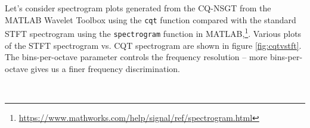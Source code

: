 \documentclass[report.tex]{subfiles}
\begin{document}
Let's consider spectrogram plots generated from the CQ-NSGT from the MATLAB Wavelet Toolbox using the \Verb#cqt# function compared with the standard STFT spectrogram using the \Verb#spectrogram# function in MATLAB,\footnote{\url{https://www.mathworks.com/help/signal/ref/spectrogram.html}}. Various plots of the STFT spectrogram vs. CQT spectrogram are shown in figure \ref{fig:cqtvstft}. The bins-per-octave parameter controls the frequency resolution -- more bins-per-octave gives us a finer frequency discrimination.

\begin{figure}[ht]
	\centering
	\\

\end{figure}
\end{document}

